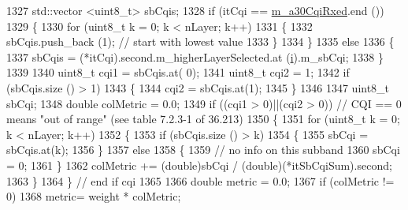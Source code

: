 \begin{DoxyCode}
1327                       std::vector <uint8\_t> sbCqis;
1328                       \textcolor{keywordflow}{if} (itCqi == \hyperlink{classns3_1_1PssFfMacScheduler_ab1bc511b7c55ead9b2e8ff1e0d4b0e3b}{m\_a30CqiRxed}.end ())
1329                         \{
1330                           \textcolor{keywordflow}{for} (uint8\_t k = 0; k < nLayer; k++)
1331                             \{
1332                               sbCqis.push\_back (1);  \textcolor{comment}{// start with lowest value}
1333                             \}
1334                         \}
1335                       \textcolor{keywordflow}{else}
1336                         \{
1337                           sbCqis = (*itCqi).second.m\_higherLayerSelected.at (\hyperlink{bernuolliDistribution_8m_a6f6ccfcf58b31cb6412107d9d5281426}{i}).m\_sbCqi;
1338                         \}
1339         
1340                       uint8\_t cqi1 = sbCqis.at( 0);
1341                       uint8\_t cqi2 = 1;
1342                       \textcolor{keywordflow}{if} (sbCqis.size () > 1)
1343                         \{
1344                           cqi2 = sbCqis.at(1);
1345                         \}
1346             
1347                       uint8\_t sbCqi;
1348                       \textcolor{keywordtype}{double} colMetric = 0.0;
1349                       \textcolor{keywordflow}{if} ((cqi1 > 0)||(cqi2 > 0)) \textcolor{comment}{// CQI == 0 means "out of range" (see table 7.2.3-1 of
       36.213)}
1350                         \{
1351                           \textcolor{keywordflow}{for} (uint8\_t k = 0; k < nLayer; k++) 
1352                             \{
1353                               \textcolor{keywordflow}{if} (sbCqis.size () > k)
1354                                 \{                       
1355                                   sbCqi = sbCqis.at(k);
1356                                 \}
1357                               \textcolor{keywordflow}{else}
1358                                 \{
1359                                   \textcolor{comment}{// no info on this subband }
1360                                   sbCqi = 0;
1361                                 \}
1362                               colMetric += (double)sbCqi / (\textcolor{keywordtype}{double})(*itSbCqiSum).second;
1363                                 \} 
1364                         \}   \textcolor{comment}{// end if cqi}
1365         
1366                       \textcolor{keywordtype}{double} metric = 0.0;
1367                       \textcolor{keywordflow}{if} (colMetric != 0)
1368                         metric= weight * colMetric;

\end{DoxyCode}

